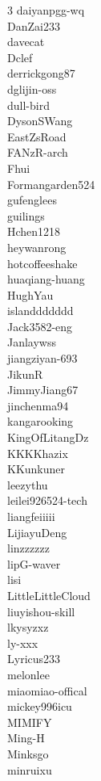 \documentclass{llmxive}
\begin{document}
\begin{multicols}{3}
daiyanpgg-wq\\
DanZai233\\
davecat\\
Dclef\\
derrickgong87\\
dglijin-oss\\
dull-bird\\
DysonSWang\\
EastZsRoad\\
FANzR-arch\\
Fhui\\
Formangarden524\\
gufenglees\\
guilings\\
Hchen1218\\
heywanrong\\
hotcoffeeshake\\
huaqiang-huang\\
HughYau\\
islanddddddd\\
Jack3582-eng\\
Janlaywss\\
jiangziyan-693\\
JikunR\\
JimmyJiang67\\
jinchenma94\\
kangarooking\\
KingOfLitangDz\\
KKKKhazix\\
KKunkuner\\
leezythu\\
leilei926524-tech\\
liangfeiiiii\\
LijiayuDeng\\
linzzzzzz\\
lipG-waver\\
lisi\\
LittleLittleCloud\\
liuyishou-skill\\
lkysyzxz\\
ly-xxx\\
Lyricus233\\
melonlee\\
miaomiao-offical\\
mickey996icu\\
MIMIFY\\
Ming-H\\
Minksgo\\
minruixu\\

\end{multicols}
\end{document}
